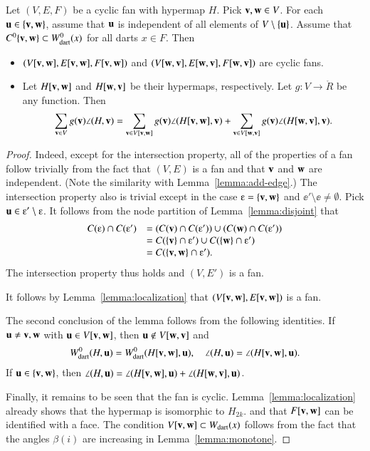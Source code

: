 \begin{lemma}[slicing]\label{lemma:slice}  Let $(V,E,F)$ be a cyclic fan with hypermap $H$.  Pick ${\mathbf v},{\mathbf w}\in V$. For each ${\mathbf u}\in \{{\mathbf v},{\mathbf w}\}$, assume that ${\mathbf u}$ is independent of all elements of $V\setminus\{{\mathbf u}\}$.    Assume that $C^0\{{\mathbf v},{\mathbf w}\}\subset W^0_{\text{dart}}(x)$ for all darts $x\in F$.  Then
\begin{itemize}
\item $(V[{\mathbf v},{\mathbf w}],E[{\mathbf v},{\mathbf w}],F[{\mathbf v},{\mathbf w}])$ and $(V[{\mathbf w},{\mathbf v}],E[{\mathbf w},{\mathbf v}],F[{\mathbf w},{\mathbf v}])$ are cyclic fans.  
\item Let $H[{\mathbf v},{\mathbf w}]$ and $H[{\mathbf w},{\mathbf v}]$ be their hypermaps, respectively.  Let $g:V\to\ring{R}$ be any function.  Then
$$
\sum_{{\mathbf v}\in V} g({\mathbf v})\angle(H,{\mathbf v}) = \sum_{{\mathbf v}\in V[{\mathbf v},{\mathbf w}]}g({\mathbf v})\angle(H[{\mathbf v},{\mathbf w}],{\mathbf v}) + \sum_{{\mathbf v}\in V[{\mathbf w},{\mathbf v}]}g({\mathbf v})\angle(H[{\mathbf w},{\mathbf v}],{\mathbf v}).
$$
\end{itemize}
\end{lemma}
%
%

\begin{proof} 
 Indeed, except for the intersection property, all of the properties of a fan follow trivially from the fact that $(V,E)$ is a fan and
that ${\mathbf v}$ and ${\mathbf w}$ are independent.  (Note the similarity with Lemma~\ref{lemma:add-edge}.)
The intersection property also is trivial except in the case $\ee=\{\v,\w\}$ and $\ee'\setminus \ee\ne \emptyset$.  Pick $\u\in \ee'\setminus\ee$.  It follows from the node
partition of Lemma~\ref{lemma:disjoint} that
$$
\begin{array}{lll}
C(\ee) \cap C(\ee') &= (C(\v) \cap C(\ee')) \cup (C(\w)\cap C(\ee')) \\
 &= C(\{\v\}\cap \ee') \cup C(\{\w\}\cap \ee') \\
 &= C(\{\v,\w\}\cap \ee').
\end{array}
$$
The intersection property thus holds and $(V,E')$ is a fan.

It follows by Lemma~\ref{lemma:localization} that $(V[{\mathbf v},{\mathbf w}],E[{\mathbf v},{\mathbf w}])$ is a fan.

The second conclusion of the lemma follows from the following identities.
If ${\mathbf u}\ne {\mathbf v},{\mathbf w}$ with ${\mathbf u}\in V[{\mathbf v},{\mathbf w}]$, then ${\mathbf u}\not\in V[{\mathbf w},{\mathbf v}]$ and 
\begin{equation}
W^0_{\text{dart}}(H,{\mathbf u})=W^0_{\text{dart}}(H[{\mathbf v},{\mathbf w}],{\mathbf u}),\quad \angle(H,{\mathbf u}) = \angle(H[{\mathbf v},{\mathbf w}],{\mathbf u}).
\end{equation}
If ${\mathbf u}\in\{{\mathbf v},{\mathbf w}\}$, then 
$\angle(H,{\mathbf u})=\angle(H[{\mathbf v},{\mathbf w}],{\mathbf u}) +\angle(H[{\mathbf w},{\mathbf v}],{\mathbf u})$.

Finally, it remains to be seen that the fan is cyclic.  Lemma~\ref{lemma:localization} already shows that the hypermap is isomorphic to $H_{2k}$. and that $F[{\mathbf v},{\mathbf w}]$ can be identified with a face.  The condition $V[{\mathbf v},{\mathbf w}]\subset W_{\text{dart}}(x)$ follows from the fact that the angles $\beta(i)$ are increasing in Lemma~\ref{lemma:monotone}.
\end{proof}



